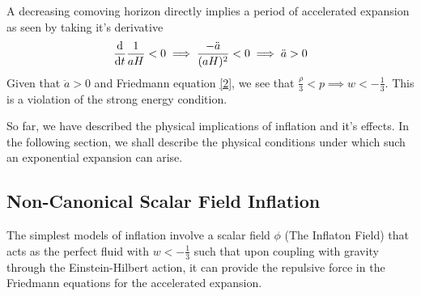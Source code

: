\documentclass[aps,prd,reprint,preprintnumbers,showpacs,floatfix,nofootinbib,superscript address]{revtex4-2}
\begin{document}
A decreasing comoving horizon directly implies a period of accelerated expansion as seen by taking it's derivative
\begin{equation}
    \frac{\mathrm{d}}{\mathrm{d}t} \frac{1}{aH} <  0 \implies \frac{-\Ddot{a}}{(aH)^2} < 0 \implies \ddot{a} > 0
\end{equation}
Given that $\ddot{a} > 0$ and Friedmann equation \ref{2}, we see that $\frac{\rho}{3} < p \implies w < - \frac{1}{3}$. This is a violation of the strong energy condition.

So far, we have described the physical implications of inflation and it's effects. In the following section, we shall describe the physical conditions under which such an exponential expansion can arise. 

\subsection{Non-Canonical Scalar Field Inflation} \label{Non-Canonical Scalar Field Inflation}
The simplest models of inflation involve a scalar field $\phi$ (The Inflaton Field) that acts as the perfect fluid with $w < -\frac{1}{3}$ such that upon coupling with gravity through the Einstein-Hilbert action, it can provide the repulsive force in the Friedmann equations for the accelerated expansion.
\end{document}
